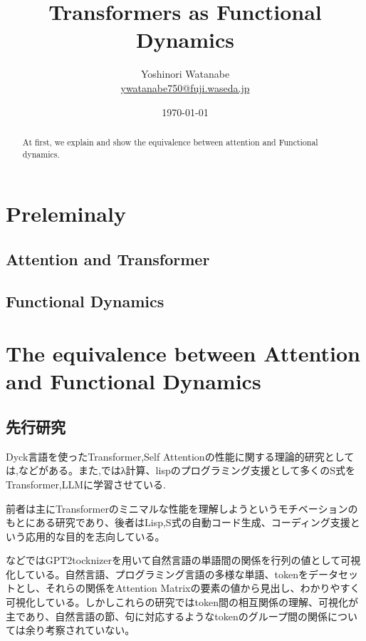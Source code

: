\documentclass[a4paper,11pt]{article}
\begin{document}
\title{Transformers as Functional Dynamics}
\author{Yoshinori Watanabe \\ \href{mailto::ywatanabe750@fuji.waseda.jp}{ywatanabe750@fuji.waseda.jp}}
\date{\today}
\maketitle

\begin{abstract}
At first, we explain 
and show the equivalence between attention and Functional dynamics.
\end{abstract}

\section{Preleminaly}
\subsection{Attention and Transformer}
\subsection{Functional Dynamics}

\section{The equivalence between Attention and Functional Dynamics}


\subsection{先行研究}
Dyck言語を使ったTransformer,Self Attentionの性能に関する理論的研究としては\cite{Hahn_2020},\cite{yao2023selfattentionnetworksprocessbounded}などがある。また\cite{miranda2023transformermodelstypeinference},\cite{flach2025neurallambdacalculusneurosymbolic}ではλ計算、lispのプログラミング支援として多くのS式をTransformer,LLMに学習させている.

前者は主にTransformerのミニマルな性能を理解しようというモチベーションのもとにある研究であり、後者はLisp,S式の自動コード生成、コーディング支援という応用的な目的を志向している。

\cite{clark2019what}などではGPT2tocknizerを用いて自然言語の単語間の関係を行列の値として可視化している。自然言語、プログラミング言語の多様な単語、tokenをデータセットとし、それらの関係をAttention Matrixの要素の値から見出し、わかりやすく可視化している。しかしこれらの研究ではtoken間の相互関係の理解、可視化が主であり、自然言語の節、句に対応するようなtokenのグループ間の関係については余り考察されていない。
\end{document}

